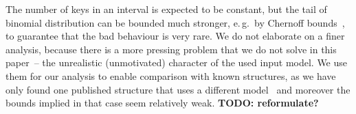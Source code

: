 The number of keys in an interval is expected to be constant, but the tail of binomial distribution can be bounded much stronger, e.\,g.~by Chernoff bounds~\cite[chapter~4.1]{randomAlgs}, to guarantee that the bad behaviour is very rare.
We do not elaborate on a finer analysis, because there is a more pressing problem that we do not solve in this paper~-- the unrealistic (unmotivated) character of the used input model.
We use them for our analysis to enable comparison with known structures, as we have only found one published structure that uses a different model~\cite{DemaineJP04} and moreover the bounds implied in that case seem relatively weak. {\bf TODO: reformulate?}


